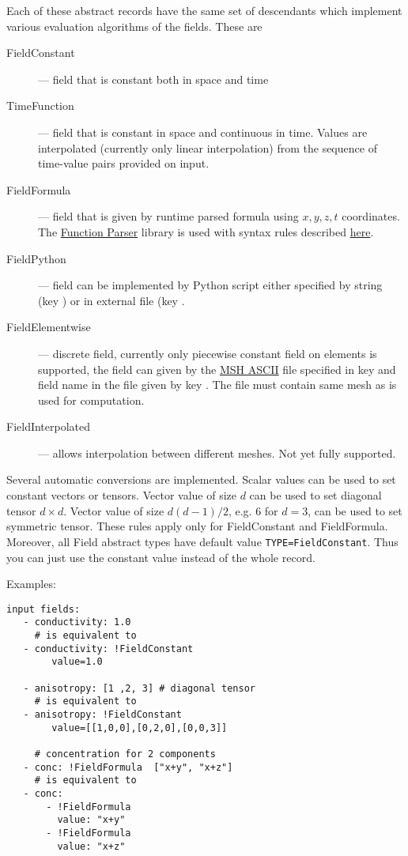 Each of these abstract records have the same set of descendants which implement various evaluation algorithms of the fields. These are
\begin{description}
 \item[FieldConstant] --- field that is constant both in space and time
 \item[TimeFunction] --- field that is constant in space and continuous in time. Values are interpolated (currently only linear interpolation) from 
 the sequence of time-value pairs provided on input.
 \item[FieldFormula] --- field that is given by runtime parsed formula using $x,y,z,t$ coordinates. The \href{http://warp.povusers.org/FunctionParser/}{Function Parser} library is used
 with syntax rules described \href{http://warp.povusers.org/FunctionParser/fparser.html#literals}{here}.
 \item[FieldPython] --- field can be implemented by Python script either specified by string (key ) 
 or in external file (key . 
 \item[FieldElementwise] --- discrete field, currently only piecewise constant field on elements is supported, the field can given by 
 the \href{http://geuz.org/gmsh/doc/texinfo/gmsh.html#MSH-ASCII-file-format}{MSH ASCII} file specified in key  and field name in the file given 
 by key . The file must contain same mesh as is used for computation.
 \item[FieldInterpolated] --- allows interpolation between different meshes. Not yet fully supported.
\end{description}

Several automatic conversions are implemented. Scalar values can be used to set constant vectors or tensors. Vector value of size $d$ can be used to set diagonal tensor $d\times d$.
Vector value of size $d(d-1)/2$, e.g. $6$ for $d=3$, can be used to set symmetric tensor. These rules apply only for FieldConstant and FieldFormula.
Moreover, all Field abstract types have default value \verb'TYPE=FieldConstant'. Thus you can just use the constant value instead of the whole record.

Examples:
\begin{verbatim}
input fields:
   - conductivity: 1.0
     # is equivalent to
   - conductivity: !FieldConstant
        value=1.0
   
   - anisotropy: [1 ,2, 3] # diagonal tensor
     # is equivalent to
   - anisotropy: !FieldConstant
        value=[[1,0,0],[0,2,0],[0,0,3]]

     # concentration for 2 components   
   - conc: !FieldFormula  ["x+y", "x+z"]
     # is equivalent to
   - conc: 
       - !FieldFormula
         value: "x+y"
       - !FieldFormula
         value: "x+z"
\end{verbatim}

